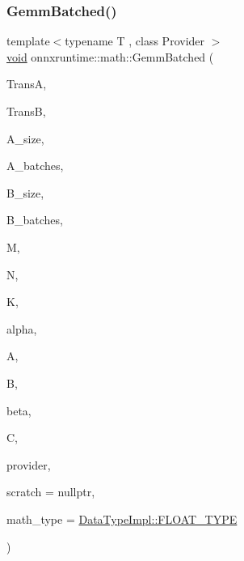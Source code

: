 \subsubsection{\texorpdfstring{Gemm\+Batched()}{GemmBatched()}}
{\footnotesize\ttfamily template$<$typename T , class Provider $>$ \\
\mbox{\hyperlink{mlasi_8h_a88f941d423cb2a819b70a1358982b1a6}{void}} onnxruntime\+::math\+::\+Gemm\+Batched (\begin{DoxyParamCaption}\item[{const \mbox{\hyperlink{cblas_8h_a44dfaddb823648755b110dbad849c5a9}{C\+B\+L\+A\+S\+\_\+\+T\+R\+A\+N\+S\+P\+O\+SE}}}]{TransA,  }\item[{const \mbox{\hyperlink{cblas_8h_a44dfaddb823648755b110dbad849c5a9}{C\+B\+L\+A\+S\+\_\+\+T\+R\+A\+N\+S\+P\+O\+SE}}}]{TransB,  }\item[{const int}]{A\+\_\+size,  }\item[{const int}]{A\+\_\+batches,  }\item[{const int}]{B\+\_\+size,  }\item[{const int}]{B\+\_\+batches,  }\item[{const int}]{M,  }\item[{const int}]{N,  }\item[{const int}]{K,  }\item[{const float}]{alpha,  }\item[{const T $\ast$}]{A,  }\item[{const T $\ast$}]{B,  }\item[{const float}]{beta,  }\item[{T $\ast$}]{C,  }\item[{Provider $\ast$}]{provider,  }\item[{\mbox{\hyperlink{classonnxruntime_1_1Tensor}{Tensor}} $\ast$}]{scratch = {\ttfamily nullptr},  }\item[{\mbox{\hyperlink{namespaceonnxruntime_ad77d0a6e838ec7da5dc35fed5ee66b49}{M\+L\+Data\+Type}}}]{math\+\_\+type = {\ttfamily \mbox{\hyperlink{math_8h_a41cf4177f569cb6b87ec5c90c0165769}{Data\+Type\+Impl\+::\+F\+L\+O\+A\+T\+\_\+\+T\+Y\+PE}}} }\end{DoxyParamCaption})}

\mbox{\label{namespaceonnxruntime_1_1math_a539b25bb6fa905d986a740ed0ff61f0e}} 
